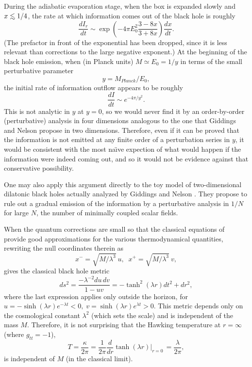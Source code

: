 \documentclass[12pt]{article}
\begin{document}
\baselineskip 14.5pt
	During the adiabatic evaporation stage,
when the box is expanded slowly and
$x{\;\raise.3ex\hbox{$<$\kern-.75em\lower1ex\hbox{$\sim$}}\;}1/4$,
the rate at which information comes out of the black hole is roughly
	\begin{equation}
	\frac{dI_r}{dt} \sim \exp(-4\pi E_0^2 \frac{3-8x}{3+8x})
	\frac{dx}{dt}.
	\end{equation}
(The prefactor in front of the exponential has been dropped,
since it is less relevant than corrections to the large negative
exponent.)  At the beginning of the black hole emission,
when (in Planck units) $M \simeq E_0 = 1/y$ in terms of the small
perturbative parameter
	\begin{equation}
	y = M_{Planck}/E_0,
	\end{equation}
the initial rate of information outflow appears to be roughly
	\begin{equation}
	\frac{dI}{dt} \sim e^{-4\pi/y^2}.
	\end{equation}
This is not analytic in $y$ at $y=0$, so we would never find it by
an order-by-order (perturbative) analysis in four dimensions
analogous to the one that Giddings and Nelson propose
\cite{GidNel,Gid92} in two dimensions.  Therefore, even if it
can be proved that the information is not emitted at any finite
order of a perturbation series in $y$, it would be consistent
with the most na\"{\i}ve expection of what would happen if the
information were indeed coming out, and so it would not be
evidence against that conservative possibility.

	One may also apply this argument directly to the toy model
\cite{CGHS} of two-\linebreak dimensional dilatonic black holes
actually analyzed by Giddings and Nelson \cite{GidNel,Gid92}.
They propose to rule out a gradual emission of the information
by a perturbative analysis in $1/N$ for large $N$, the number
of minimally coupled scalar fields.

	When the quantum corrections are small so that
the classical equations of \cite{CGHS} provide good
approximations for the various thermodynamical quantities,
rewriting the null coordinates therein as
	\begin{equation}
	x^-=\sqrt{M/\lambda^3}\:u,\;\;x^+=\sqrt{M/\lambda^3}\:v,
	\end{equation}
gives the classical black hole metric \cite{2DBH}
	\begin{equation}
	ds^2=\frac{-\lambda^{-2} du\,dv}{1-uv}
	=-\tanh^2(\lambda r)dt^2+dr^2,
	\end{equation}
where the last expression applies only outside the horizon,
for $u=-\sinh(\lambda r)e^{-\lambda t}<0,\;
v=\sinh(\lambda r)e^{\lambda t}>0$.  This metric depends
only on the cosmological constant $\lambda^2$
(which sets the scale) and is independent of the mass $M$.
Therefore, it is not surprising that the Hawking temperature
at $r=\infty$ (where $g_{tt}=-1$),
	\begin{equation}
	T=\frac{\kappa}{2\pi}
	=\frac{1}{2\pi}\frac{d}{dr}\tanh(\lambda r)|_{r=0}\,
	=\frac{\lambda}{2\pi},
	\end{equation}
is independent of $M$ (in the classical limit).
\end{document}
